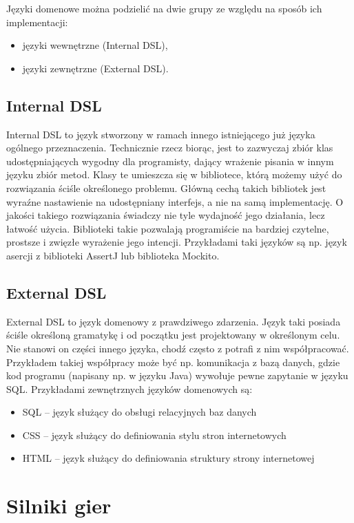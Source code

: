 \documentclass[openright]{xmgr}
\begin{document}
Języki domenowe można podzielić na dwie grupy ze względu na sposób ich implementacji:
\begin{itemize}
\item języki wewnętrzne (Internal DSL),
\item języki zewnętrzne (External DSL).
\end{itemize}

\subsection{Internal DSL}

Internal DSL to język stworzony w ramach innego istniejącego już języka ogólnego przeznaczenia. Technicznie rzecz biorąc, jest to zazwyczaj zbiór klas udostępniających wygodny dla programisty, dający wrażenie pisania w innym języku zbiór metod. Klasy te umieszcza się w bibliotece, którą możemy użyć do rozwiązania ściśle określonego problemu. Główną cechą takich bibliotek jest wyraźne nastawienie na udostępniany interfejs, a nie na samą implementację. O jakości takiego rozwiązania świadczy nie tyle wydajność jego działania, lecz łatwość użycia. Biblioteki takie pozwalają programiście na bardziej czytelne, prostsze i zwięzłe wyrażenie jego intencji. Przykładami taki języków są np. język asercji z biblioteki AssertJ lub  biblioteka Mockito. 

\subsection{External DSL}

External DSL to język domenowy z prawdziwego zdarzenia. Język taki posiada ściśle określoną gramatykę i od początku jest projektowany w określonym celu. Nie stanowi on części innego języka, chodź często z potrafi z nim współpracować. Przykładem takiej współpracy może być np. komunikacja z bazą danych, gdzie kod programu (napisany np. w języku Java) wywołuje pewne zapytanie w języku SQL. Przykładami zewnętrznych języków domenowych są:
\begin{itemize}
	\item SQL -- język służący do obsługi relacyjnych baz danych
	\item CSS -- język służący do definiowania stylu stron internetowych 
	\item HTML -- język służący do definiowania struktury strony internetowej
\end{itemize}

\section{Silniki gier}
\end{document}
